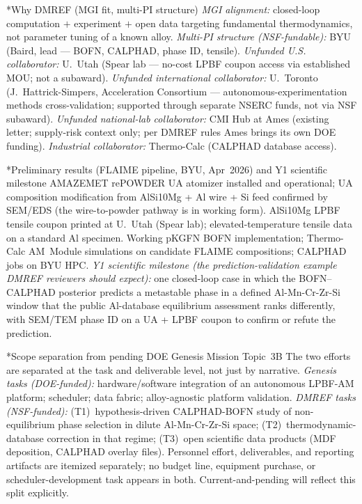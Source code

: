 \documentclass[10pt]{article}
\makeatletter
\renewcommand{\section}{\@startsection{section}{1}{0pt}{0.4ex plus 0.1ex}{0.15ex}{\normalfont\bfseries}}
\makeatother
\begin{document}
\section*{Why DMREF (MGI fit, multi-PI structure)}
\emph{MGI alignment:} closed-loop computation $+$ experiment $+$ open data targeting fundamental thermodynamics, not parameter tuning of a known alloy. \emph{Multi-PI structure (NSF-fundable):} BYU (Baird, lead --- BOFN, CALPHAD, phase ID, tensile). \emph{Unfunded U.S. collaborator:} U.~Utah (Spear lab --- no-cost LPBF coupon access via established MOU; not a subaward). \emph{Unfunded international collaborator:} U.~Toronto (J.~Hattrick-Simpers, Acceleration Consortium --- autonomous-experimentation methods cross-validation; supported through separate NSERC funds, not via NSF subaward). \emph{Unfunded national-lab collaborator:} CMI Hub at Ames (existing letter; supply-risk context only; per DMREF rules Ames brings its own DOE funding). \emph{Industrial collaborator:} Thermo-Calc (CALPHAD database access).

\section*{Preliminary results (FLAIME pipeline, BYU, Apr~2026) and Y1 scientific milestone}
AMAZEMET rePOWDER UA atomizer installed and operational; UA composition modification from AlSi10Mg + Al wire + Si feed confirmed by SEM/EDS (the wire-to-powder pathway is in working form). AlSi10Mg LPBF tensile coupon printed at U.~Utah (Spear lab); elevated-temperature tensile data on a standard Al specimen. Working pKGFN BOFN implementation; Thermo-Calc AM~Module simulations on candidate FLAIME compositions; CALPHAD jobs on BYU HPC. \emph{Y1 scientific milestone (the prediction-validation example DMREF reviewers should expect):} one closed-loop case in which the BOFN--CALPHAD posterior predicts a metastable phase in a defined Al-Mn-Cr-Zr-Si window that the public Al-database equilibrium assessment ranks differently, with SEM/TEM phase ID on a UA + LPBF coupon to confirm or refute the prediction.

\section*{Scope separation from pending DOE Genesis Mission Topic~3B}
The two efforts are separated at the task and deliverable level, not just by narrative. \emph{Genesis tasks (DOE-funded):} hardware/software integration of an autonomous LPBF-AM platform; scheduler; data fabric; alloy-agnostic platform validation. \emph{DMREF tasks (NSF-funded):} (T1)~hypothesis-driven CALPHAD-BOFN study of non-equilibrium phase selection in dilute Al-Mn-Cr-Zr-Si space; (T2)~thermodynamic-database correction in that regime; (T3)~open scientific data products (MDF deposition, CALPHAD overlay files). Personnel effort, deliverables, and reporting artifacts are itemized separately; no budget line, equipment purchase, or scheduler-development task appears in both. Current-and-pending will reflect this split explicitly.
\end{document}
